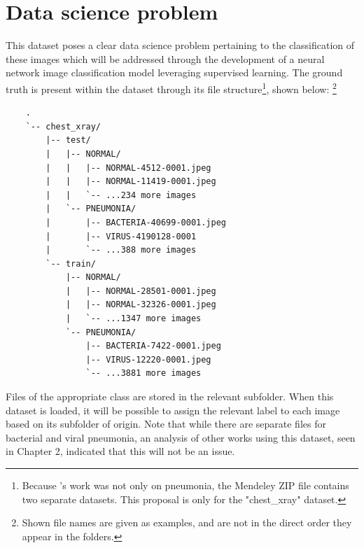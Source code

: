 \documentclass[12pt]{report}
\begin{document}
\pagebreak 

\section{Data science problem}
This dataset poses a clear data science problem pertaining to the classification of these images which will be addressed through the 
development of a neural network image classification model leveraging supervised learning. The ground truth is present within  
the dataset through its file structure\footnote{Because \textcite{kermanyIdentifyingMedicalDiagnoses2018}'s work was not only on pneumonia, the Mendeley ZIP file contains two separate datasets. This proposal is only for the "chest\_xray" dataset.}, shown below:
\footnote{Shown file names are given as examples, and are not in the direct order they appear in the folders.}

\begin{verbatim}
    .
    `-- chest_xray/
        |-- test/
        |   |-- NORMAL/
        |   |   |-- NORMAL-4512-0001.jpeg
        |   |   |-- NORMAL-11419-0001.jpeg
        |   |   `-- ...234 more images
        |   `-- PNEUMONIA/
        |       |-- BACTERIA-40699-0001.jpeg
        |       |-- VIRUS-4190128-0001
        |       `-- ...388 more images
        `-- train/
            |-- NORMAL/
            |   |-- NORMAL-28501-0001.jpeg
            |   |-- NORMAL-32326-0001.jpeg
            |   `-- ...1347 more images
            `-- PNEUMONIA/
                |-- BACTERIA-7422-0001.jpeg
                |-- VIRUS-12220-0001.jpeg
                `-- ...3881 more images
\end{verbatim}

\noindent Files of the appropriate class are stored in the relevant subfolder. When this dataset is loaded, it will be possible to 
assign the relevant label to each image based on its subfolder of origin. Note that while there are separate files for bacterial and 
viral pneumonia, an analysis of other works using this dataset, seen in Chapter 2, indicated that this will not be an issue.


\end{document}
